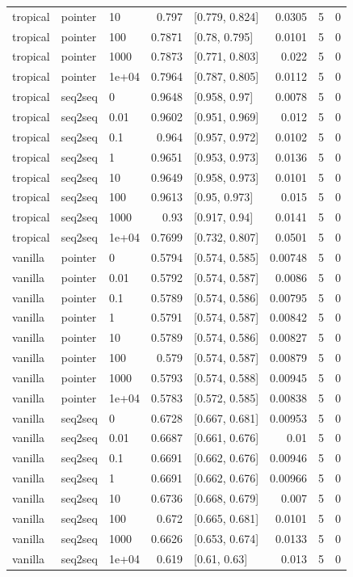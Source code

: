 \documentclass[10pt]{article}
\begin{document}
{\begin{longtable}{lllrlrrr}
tropical & pointer & 10 & 0.797 & [0.779, 0.824] & 0.0305 & 5 & 0\\
tropical & pointer & 100 & 0.7871 & [0.78, 0.795] & 0.0101 & 5 & 0\\
tropical & pointer & 1000 & 0.7873 & [0.771, 0.803] & 0.022 & 5 & 0\\
tropical & pointer & 1e+04 & 0.7964 & [0.787, 0.805] & 0.0112 & 5 & 0\\
tropical & seq2seq & 0 & 0.9648 & [0.958, 0.97] & 0.0078 & 5 & 0\\
tropical & seq2seq & 0.01 & 0.9602 & [0.951, 0.969] & 0.012 & 5 & 0\\
tropical & seq2seq & 0.1 & 0.964 & [0.957, 0.972] & 0.0102 & 5 & 0\\
tropical & seq2seq & 1 & 0.9651 & [0.953, 0.973] & 0.0136 & 5 & 0\\
tropical & seq2seq & 10 & 0.9649 & [0.958, 0.973] & 0.0101 & 5 & 0\\
tropical & seq2seq & 100 & 0.9613 & [0.95, 0.973] & 0.015 & 5 & 0\\
tropical & seq2seq & 1000 & 0.93 & [0.917, 0.94] & 0.0141 & 5 & 0\\
tropical & seq2seq & 1e+04 & 0.7699 & [0.732, 0.807] & 0.0501 & 5 & 0\\
vanilla & pointer & 0 & 0.5794 & [0.574, 0.585] & 0.00748 & 5 & 0\\
vanilla & pointer & 0.01 & 0.5792 & [0.574, 0.587] & 0.0086 & 5 & 0\\
vanilla & pointer & 0.1 & 0.5789 & [0.574, 0.586] & 0.00795 & 5 & 0\\
vanilla & pointer & 1 & 0.5791 & [0.574, 0.587] & 0.00842 & 5 & 0\\
vanilla & pointer & 10 & 0.5789 & [0.574, 0.586] & 0.00827 & 5 & 0\\
vanilla & pointer & 100 & 0.579 & [0.574, 0.587] & 0.00879 & 5 & 0\\
vanilla & pointer & 1000 & 0.5793 & [0.574, 0.588] & 0.00945 & 5 & 0\\
vanilla & pointer & 1e+04 & 0.5783 & [0.572, 0.585] & 0.00838 & 5 & 0\\
vanilla & seq2seq & 0 & 0.6728 & [0.667, 0.681] & 0.00953 & 5 & 0\\
vanilla & seq2seq & 0.01 & 0.6687 & [0.661, 0.676] & 0.01 & 5 & 0\\
vanilla & seq2seq & 0.1 & 0.6691 & [0.662, 0.676] & 0.00946 & 5 & 0\\
vanilla & seq2seq & 1 & 0.6691 & [0.662, 0.676] & 0.00966 & 5 & 0\\
vanilla & seq2seq & 10 & 0.6736 & [0.668, 0.679] & 0.007 & 5 & 0\\
vanilla & seq2seq & 100 & 0.672 & [0.665, 0.681] & 0.0101 & 5 & 0\\
vanilla & seq2seq & 1000 & 0.6626 & [0.653, 0.674] & 0.0133 & 5 & 0\\
vanilla & seq2seq & 1e+04 & 0.619 & [0.61, 0.63] & 0.013 & 5 & 0\\
\bottomrule
\end{longtable}
}
\end{document}
